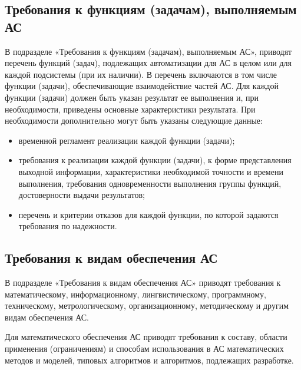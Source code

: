 {\subsection{Требования к функциям (задачам), выполняемым АС}
В подразделе «Требования к функциям (задачам), выполняемым АС», приводят перечень функций (задач), подлежащих автоматизации для АС в целом или для каждой подсистемы (при их наличии). В перечень включаются в том числе функции  (задачи), обеспечивающие взаимодействие частей АС.
Для каждой функции (задачи) должен быть указан результат ее выполнения и, при необходимости, приведены основные характеристики результата. При необходимости дополнительно могут быть указаны следующие данные:
\begin{itemize}
  \item временной регламент реализации каждой функции (задачи);
  \item требования к реализации каждой функции (задачи), к форме представления выходной информации, характеристики необходимой точности и времени выполнения, требования одновременности выполнения группы функций, достоверности выдачи результатов;
  \item перечень и критерии отказов для каждой функции, по которой задаются требования по надежности.
\end{itemize}
\subsection{Требования к видам обеспечения АС}
В подразделе «Требования к видам обеспечения АС» приводят требования к математическому, информационному, лингвистическому, программному, техническому, метрологическому, организационному, методическому и другим видам обеспечения АС.

Для математического обеспечения АС приводят требования к составу, области применения (ограничениям) и способам использования в АС математических методов и моделей, типовых алгоритмов и алгоритмов, подлежащих разработке.

}
